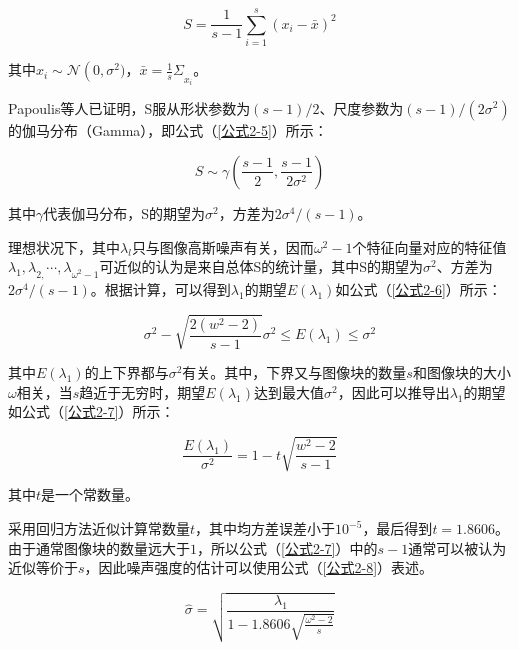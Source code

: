 \begin{equation}\label{公式2-4}
	S=\frac{1}{s-1} \sum_{i=1}^{s}\left(x_{i}-\bar{x}\right)^{2}
\end{equation}

其中$x_i\sim\mathcal{N}\left(0,\sigma^2\right.)$，$\bar{x}={\frac{1}{s}\Sigma}_{x_i}$。

Papoulis等人\cite{45}已证明，S服从形状参数为$\left(s-1\right)/2$、尺度参数为$\left(s-1\right)/\left({2\sigma}^2\right)$的伽马分布（Gamma），即公式（\ref{公式2-5}）所示：

\begin{equation}\label{公式2-5}
	S\sim\gamma\left(\frac{s-1}{2},\frac{s-1}{2\sigma^2}\right)
\end{equation}

其中$\gamma$代表伽马分布，S的期望为$\sigma^2$，方差为$2\sigma^4/\left(s-1\right)$。

理想状况下，其中$\lambda_l$只与图像高斯噪声有关，因而$\omega^2-1$个特征向量对应的特征值$\lambda_1{,\lambda}_{2,}\cdots{,\lambda}_{\omega^2-1}$可近似的认为是来自总体S的统计量，其中S的期望为$\sigma^2$、方差为$2\sigma^4/\left(s-1\right)$。根据计算，可以得到$\lambda_1$的期望$E\left(\lambda_1\right)$如公式（\ref{公式2-6}）所示：

\begin{equation}\label{公式2-6}
	\sigma^2-\sqrt{\frac{2\left(w^2-2\right)}{s-1}}\sigma^2\le E\left(\lambda_1\right)\le\sigma^2
\end{equation}


其中$E\left(\lambda_1\right)$的上下界都与$\sigma^2$有关。其中，下界又与图像块的数量$s$和图像块的大小$\omega$相关，当$s$趋近于无穷时，期望$E\left(\lambda_1\right)$达到最大值$\sigma^2$，因此可以推导出$\lambda_1$的期望如公式（\ref{公式2-7}）所示：

\begin{equation}\label{公式2-7}
	\frac{E\left(\lambda_1\right)}{\sigma^2}=1-t\sqrt{\frac{w^2-2}{s-1}}
\end{equation}

其中$t$是一个常数量。


采用回归方法近似计算常数量$t$，其中均方差误差小于${10}^{-5}$，最后得到$t=1.8606$。由于通常图像块的数量远大于$1$，所以公式（\ref{公式2-7}）中的$s-1$通常可以被认为近似等价于$s$，因此噪声强度的估计可以使用公式（\ref{公式2-8}）表述。

\begin{equation}\label{公式2-8}
	\hat{\sigma}=\sqrt{\frac{\lambda_1}{1-1.8606\sqrt{\frac{\omega^2-2}{s}}}}
\end{equation}

